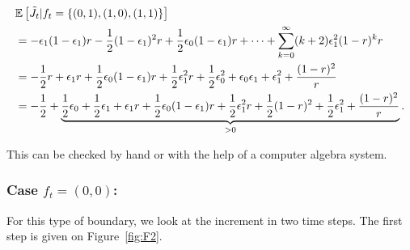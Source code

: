 \documentclass[11pt]{article}
\theoremstyle{plain}
\theoremstyle{definition}
\theoremstyle{remark}
\newcommand{\esp}[1]{\mathbb{E}\left[ #1 \right]}
\begin{document}
\begin{align}
  & \esp{\Tilde{J}_t| f_t = \{(0,1),(1,0),(1,1)\}} \nonumber \\
  & = - \epsilon_1 (1-\epsilon_1)r - \frac{1}{2} (1-\epsilon_1)^2 r + \frac{1}{2} \epsilon_0(1-\epsilon_1)r + \dots + \sum_{k=0}^\infty (k+2) \epsilon_1^2 (1-r)^k r \nonumber \\ 
  & = -\frac{1}{2}r + \epsilon_1 r + \frac{1}{2}\epsilon_0 (1-\epsilon_1)r  + \frac{1}{2} \epsilon_1^2 r  + \frac{1}{2}\epsilon_0^2 +\epsilon_0\epsilon_1 + \epsilon_1^2 + \frac{(1-r)^2}{r} \nonumber \\
  & = -\frac{1}{2} + \underbrace{\frac{1}{2} \epsilon_0 + \frac{1}{2} \epsilon_1 + \epsilon_1 r + \frac{1}{2}\epsilon_0 (1-\epsilon_1)r  + \frac{1}{2} \epsilon_1^2 r  + \frac{1}{2} (1-r)^2 + \frac{1}{2} \epsilon_1^2 + \frac{(1-r)^2}{r}}_{>0}. \label{eq:1stepn21}
\end{align}

This can be checked by hand or with the help of a computer algebra system.

\subsubsection{Case $f_t = (0,0)$:}
For this type of boundary, we look at the increment in two time steps. The first step is given on Figure~\ref{fig:F2}. 
\end{document}
